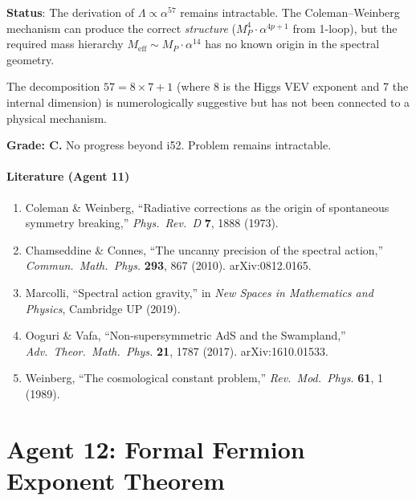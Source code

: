 \documentclass[11pt,a4paper]{article}
\begin{document}
\begin{tcolorbox}[colback=red!5!white, colframe=red!60!black, title={Agent 11: $\alpha^{57}$ Assessment}]
\textbf{Status}: The derivation of $\Lambda \propto \alpha^{57}$ remains intractable. The Coleman--Weinberg mechanism can produce the correct \emph{structure} ($M_P^4 \cdot \alpha^{4p+1}$ from 1-loop), but the required mass hierarchy $M_{\mathrm{eff}} \sim M_P \cdot \alpha^{14}$ has no known origin in the spectral geometry.

The decomposition $57 = 8 \times 7 + 1$ (where 8 is the Higgs VEV exponent and 7 the internal dimension) is numerologically suggestive but has not been connected to a physical mechanism.

\textbf{Grade: C.} No progress beyond i52. Problem remains intractable.
\end{tcolorbox}

\subsection{Literature (Agent 11)}

\begin{enumerate}
\item Coleman \& Weinberg, ``Radiative corrections as the origin of spontaneous symmetry breaking,'' \textit{Phys.\ Rev.\ D} \textbf{7}, 1888 (1973).
\item Chamseddine \& Connes, ``The uncanny precision of the spectral action,'' \textit{Commun.\ Math.\ Phys.} \textbf{293}, 867 (2010). arXiv:0812.0165.
\item Marcolli, ``Spectral action gravity,'' in \textit{New Spaces in Mathematics and Physics}, Cambridge UP (2019).
\item Ooguri \& Vafa, ``Non-supersymmetric AdS and the Swampland,'' \textit{Adv.\ Theor.\ Math.\ Phys.} \textbf{21}, 1787 (2017). arXiv:1610.01533.
\item Weinberg, ``The cosmological constant problem,'' \textit{Rev.\ Mod.\ Phys.} \textbf{61}, 1 (1989).
\end{enumerate}


\part{Agent 12: Formal Fermion Exponent Theorem}
\label{part:fermion-exp}
\end{document}
